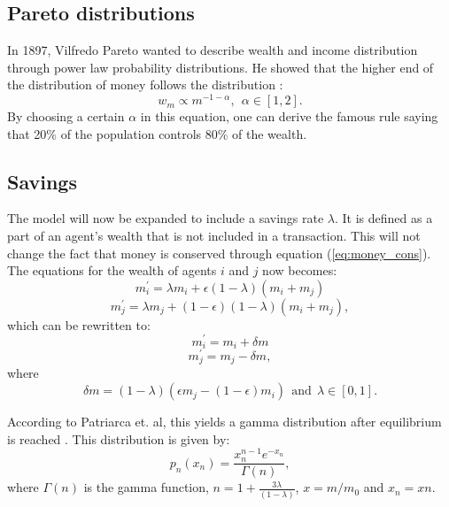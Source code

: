 \documentclass[11pt,a4paper,titlepage]{article}
\begin{document}
\subsection{Pareto distributions}
In 1897, Vilfredo Pareto wanted to describe wealth and income distribution through power law probability distributions. He showed that the higher end of the distribution of money follows the distribution \cite{Pareto}:
\begin{equation}
\label{eq:pareto_dist}
w_m \propto m^{-1-\alpha}, \ \ \alpha\in [1,2].
\end{equation}
By choosing a certain $\alpha$ in this equation, one can derive the famous rule saying that 20\% of the population controls 80\% of the wealth.

\subsection{Savings}
The model will now be expanded to include a savings rate $\lambda$. It is defined as a part of an agent's wealth that is not included in a transaction. This will not change the fact that money is conserved through equation (\ref{eq:money_cons}). The equations for the wealth of agents $i$ and $j$ now becomes:
\begin{equation}
m^{'}_{i} = \lambda m_i + \epsilon(1-\lambda)(m_i + m_j)
\end{equation}
\begin{equation}
m^{'}_j = \lambda m_j + (1-\epsilon)(1-\lambda)(m_i + m_j),
\end{equation}
which can be rewritten to:
\begin{equation}
m_i^{'} = m_i + \delta m
\end{equation}
\begin{equation}
m_j^{'} = m_{j} - \delta m,
\end{equation}
where
\begin{equation}
\delta m = (1-\lambda)(\epsilon m_j - (1-\epsilon)m_i) \ \ \textrm{and} \ \ \lambda \in [0,1].
\end{equation}

According to Patriarca et. al, this yields a gamma distribution after equilibrium is reached \cite{Patriarca}. This distribution is given by:
\begin{equation}
p_n (x_n) = \frac{x_n^{n-1}e^{-x_n}}{\Gamma (n)},
\end{equation}
where $\Gamma(n)$ is the gamma function, $n = 1 + \frac{3\lambda}{(1-\lambda)}$, $x = m/m_0$ and $x_n = xn$.
\end{document}
